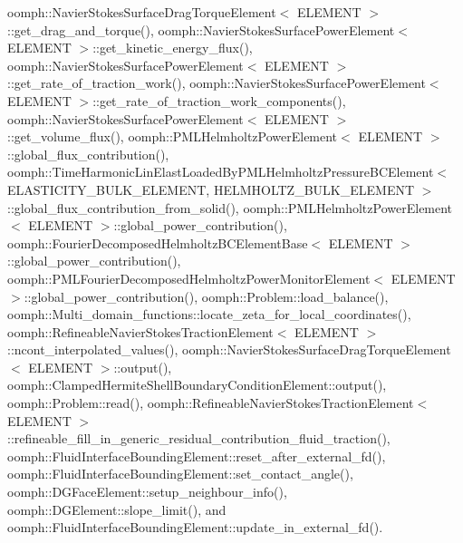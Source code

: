 oomph\+::\+Navier\+Stokes\+Surface\+Drag\+Torque\+Element$<$ E\+L\+E\+M\+E\+N\+T $>$\+::get\+\_\+drag\+\_\+and\+\_\+torque(), oomph\+::\+Navier\+Stokes\+Surface\+Power\+Element$<$ E\+L\+E\+M\+E\+N\+T $>$\+::get\+\_\+kinetic\+\_\+energy\+\_\+flux(), oomph\+::\+Navier\+Stokes\+Surface\+Power\+Element$<$ E\+L\+E\+M\+E\+N\+T $>$\+::get\+\_\+rate\+\_\+of\+\_\+traction\+\_\+work(), oomph\+::\+Navier\+Stokes\+Surface\+Power\+Element$<$ E\+L\+E\+M\+E\+N\+T $>$\+::get\+\_\+rate\+\_\+of\+\_\+traction\+\_\+work\+\_\+components(), oomph\+::\+Navier\+Stokes\+Surface\+Power\+Element$<$ E\+L\+E\+M\+E\+N\+T $>$\+::get\+\_\+volume\+\_\+flux(), oomph\+::\+P\+M\+L\+Helmholtz\+Power\+Element$<$ E\+L\+E\+M\+E\+N\+T $>$\+::global\+\_\+flux\+\_\+contribution(), oomph\+::\+Time\+Harmonic\+Lin\+Elast\+Loaded\+By\+P\+M\+L\+Helmholtz\+Pressure\+B\+C\+Element$<$ E\+L\+A\+S\+T\+I\+C\+I\+T\+Y\+\_\+\+B\+U\+L\+K\+\_\+\+E\+L\+E\+M\+E\+N\+T, H\+E\+L\+M\+H\+O\+L\+T\+Z\+\_\+\+B\+U\+L\+K\+\_\+\+E\+L\+E\+M\+E\+N\+T $>$\+::global\+\_\+flux\+\_\+contribution\+\_\+from\+\_\+solid(), oomph\+::\+P\+M\+L\+Helmholtz\+Power\+Element$<$ E\+L\+E\+M\+E\+N\+T $>$\+::global\+\_\+power\+\_\+contribution(), oomph\+::\+Fourier\+Decomposed\+Helmholtz\+B\+C\+Element\+Base$<$ E\+L\+E\+M\+E\+N\+T $>$\+::global\+\_\+power\+\_\+contribution(), oomph\+::\+P\+M\+L\+Fourier\+Decomposed\+Helmholtz\+Power\+Monitor\+Element$<$ E\+L\+E\+M\+E\+N\+T $>$\+::global\+\_\+power\+\_\+contribution(), oomph\+::\+Problem\+::load\+\_\+balance(), oomph\+::\+Multi\+\_\+domain\+\_\+functions\+::locate\+\_\+zeta\+\_\+for\+\_\+local\+\_\+coordinates(), oomph\+::\+Refineable\+Navier\+Stokes\+Traction\+Element$<$ E\+L\+E\+M\+E\+N\+T $>$\+::ncont\+\_\+interpolated\+\_\+values(), oomph\+::\+Navier\+Stokes\+Surface\+Drag\+Torque\+Element$<$ E\+L\+E\+M\+E\+N\+T $>$\+::output(), oomph\+::\+Clamped\+Hermite\+Shell\+Boundary\+Condition\+Element\+::output(), oomph\+::\+Problem\+::read(), oomph\+::\+Refineable\+Navier\+Stokes\+Traction\+Element$<$ E\+L\+E\+M\+E\+N\+T $>$\+::refineable\+\_\+fill\+\_\+in\+\_\+generic\+\_\+residual\+\_\+contribution\+\_\+fluid\+\_\+traction(), oomph\+::\+Fluid\+Interface\+Bounding\+Element\+::reset\+\_\+after\+\_\+external\+\_\+fd(), oomph\+::\+Fluid\+Interface\+Bounding\+Element\+::set\+\_\+contact\+\_\+angle(), oomph\+::\+D\+G\+Face\+Element\+::setup\+\_\+neighbour\+\_\+info(), oomph\+::\+D\+G\+Element\+::slope\+\_\+limit(), and oomph\+::\+Fluid\+Interface\+Bounding\+Element\+::update\+\_\+in\+\_\+external\+\_\+fd().

\mbox{\label{classoomph_1_1FaceElement_a8d2cf880d94b4b23ca2a25a6afaf7146}} 
